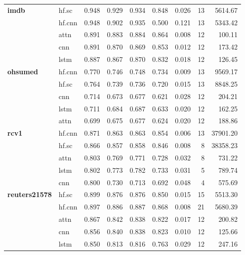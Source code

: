 \documentclass[final]{clv2025-revised}
\begin{document}
\begin{table}[h!]
\begin{tabular}{@{}p{2cm}p{1.2cm}rrrrrrr@{}}
\midrule
\textbf{imdb} & hf.sc & 0.948 & 0.929 & 0.934 & 0.848 & 0.026 & 13 & 5614.67 \\
 & hf.cnn & 0.948 & 0.902 & 0.935 & 0.500 & 0.121 & 13 & 5343.42 \\
 & attn & 0.891 & 0.883 & 0.884 & 0.864 & 0.008 & 12 & 100.11 \\
 & cnn & 0.891 & 0.870 & 0.869 & 0.853 & 0.012 & 12 & 173.42 \\
 & lstm & 0.887 & 0.867 & 0.870 & 0.832 & 0.018 & 12 & 126.45 \\
\midrule
\textbf{ohsumed} & hf.cnn & 0.770 & 0.746 & 0.748 & 0.734 & 0.009 & 13 & 9569.17 \\
 & hf.sc & 0.764 & 0.739 & 0.736 & 0.720 & 0.015 & 13 & 8848.25 \\
 & cnn & 0.714 & 0.673 & 0.677 & 0.621 & 0.028 & 12 & 204.21 \\
 & lstm & 0.711 & 0.684 & 0.687 & 0.633 & 0.020 & 12 & 162.25 \\
 & attn & 0.699 & 0.675 & 0.677 & 0.624 & 0.020 & 12 & 188.86 \\
\midrule
\textbf{rcv1} & hf.cnn & 0.871 & 0.863 & 0.863 & 0.854 & 0.006 & 13 & 37901.20 \\
 & hf.sc & 0.866 & 0.857 & 0.858 & 0.846 & 0.008 & 8 & 38358.23 \\
 & attn & 0.803 & 0.769 & 0.771 & 0.728 & 0.032 & 8 & 731.22 \\
 & lstm & 0.802 & 0.773 & 0.782 & 0.733 & 0.031 & 5 & 789.74 \\
 & cnn & 0.800 & 0.730 & 0.713 & 0.692 & 0.048 & 4 & 575.69 \\
\midrule
\textbf{reuters21578} & hf.sc & 0.899 & 0.876 & 0.876 & 0.850 & 0.015 & 15 & 5513.30 \\
 & hf.cnn & 0.897 & 0.886 & 0.887 & 0.868 & 0.008 & 21 & 5680.39 \\
 & attn & 0.867 & 0.842 & 0.838 & 0.822 & 0.017 & 12 & 200.82 \\
 & cnn & 0.856 & 0.840 & 0.838 & 0.823 & 0.010 & 12 & 125.66 \\
 & lstm & 0.850 & 0.813 & 0.816 & 0.763 & 0.029 & 12 & 247.16 \\
\bottomrule
\end{tabular}
\end{table}
\end{document}
